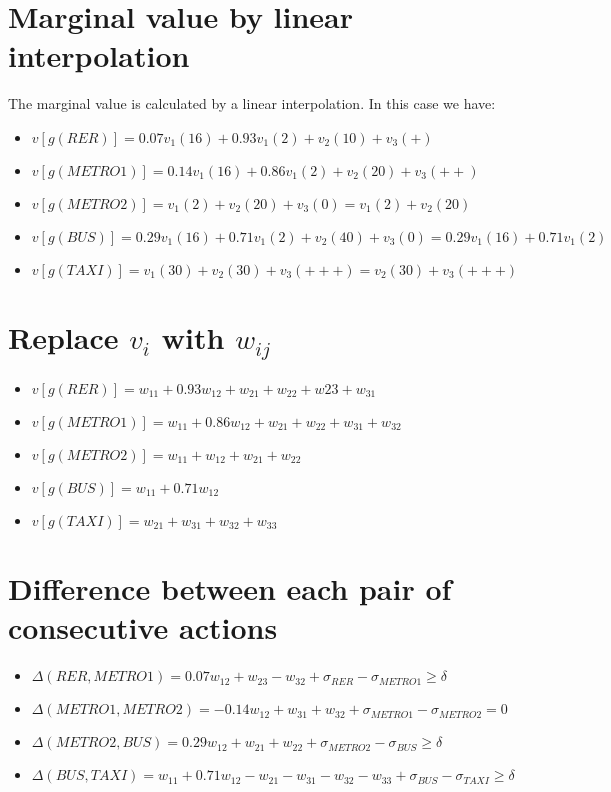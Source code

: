 \documentclass{article}
\begin{document}
\section{Marginal value by linear interpolation}
The marginal value is calculated by a linear interpolation. In this case we have: 
\begin{itemize}
\item $v[g(RER)]= 0.07  v_1 (16) + 0.93 v_1(2) + v_2(10) + v_3(+)$
\item $v[g(METRO1)]= 0.14 v_1 (16) + 0.86 v_1(2) + v_2(20) + v_3(++)$
\item $v[g(METRO2)]= v_1 (2) + v_2(20) + v_3(0) =  v_1 (2) + v_2(20) $
\item $v[g(BUS)]= 0.29  v_1 (16) + 0.71 v_1(2) + v_2(40) + v_3(0) = 0.29 v_1 (16) + 0.71 v_1(2)$
\item $v[g(TAXI)]= v_1 (30) + v_2(30) + v_3(+++) = v_2(30) + v_3(+++)$
\end{itemize}

\section{Replace $v_i$ with $w_{ij} $}
\begin{itemize}
\item $v[g(RER)]= w_{11} + 0.93 w_{12} + w_{21} + w_{22} + w{23} + w_{31}$
\item $v[g(METRO1)]=w_{11} + 0.86 w_{12} + w_{21} + w_{22} + w_{31} + w_{32}$
\item $v[g(METRO2)]= w_{11} + w_{12} + w_{21} + w_{22} $
\item $v[g(BUS)]= w_{11} + 0.71 w_{12}$
\item $v[g(TAXI)]= w_{21} + w_{31} + w_{32} + w_{33}$
\end{itemize}

\section{Difference between each pair of consecutive actions}
\begin{itemize}
\item $\Delta (RER, METRO1) = 0.07 w_{12} + w_{23} - w_{32} + \sigma_{RER} - \sigma_{METRO1} \geq \delta$
\item $\Delta (METRO1, METRO2) = -0.14 w_{12} + w_{31} + w_{32} + \sigma_{METRO1}- \sigma_{METRO2} = 0$
\item $\Delta (METRO2, BUS) = 0.29 w_{12} + w_{21} + w_{22} + \sigma_{METRO2} - \sigma_{BUS} \geq \delta$
\item $\Delta (BUS, TAXI) = w_{11} + 0.71w_{12} - w_{21} - w_{31} - w_{32} - w_{33} + \sigma_{BUS} - \sigma_{TAXI} \geq \delta$
\end{itemize}
\end{document}
